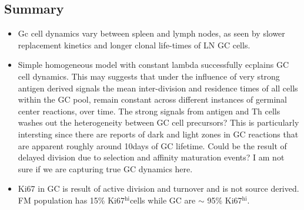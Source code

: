\documentclass[11pt]{article}
\newcommand{\khi}{Ki67$^\text{hi}$}
\begin{document}
	\subsection*{Summary}
	\begin{itemize}
		\item Gc cell dynamics vary between spleen and lymph nodes, as seen by slower replacement kinetics and longer clonal life-times of LN GC cells.
		
		\item Simple homogeneous model with constant lambda successfully ecplains GC cell dynamics.
		This may suggests that under the influence of very strong antigen derived signals the mean inter-division and residence times of all cells within the GC pool, remain constant across different instances of germinal center reactions, over time.
		The strong signals from antigen and Th cells washes out the heterogeneity between GC cell precursors?
		This is particularly intersting since there are reports of dark and light zones in GC reactions that are apparent roughly around 10days of GC lifetime. Could be the result of delayed division due to selection and affinity maturation events?
		I am not sure if we are capturing true GC dynamics here.
		
		\item Ki67 in GC is result of active division and turnover and is not source derived. FM population has 15\% \khi cells while GC are $\sim$ 95\% \khi. 
	\end{itemize}
	   
\end{document}
